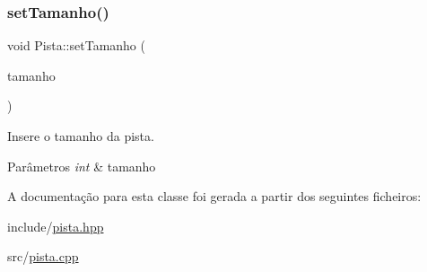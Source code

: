 \subsubsection{\texorpdfstring{set\+Tamanho()}{setTamanho()}}
{\footnotesize\ttfamily void Pista\+::set\+Tamanho (\begin{DoxyParamCaption}\item[{int}]{tamanho }\end{DoxyParamCaption})}



Insere o tamanho da pista. 


\begin{DoxyParams}{Parâmetros}
{\em int} & tamanho \\
\hline
\end{DoxyParams}


A documentação para esta classe foi gerada a partir dos seguintes ficheiros\+:\begin{DoxyCompactItemize}
\item 
include/\hyperlink{pista_8hpp}{pista.\+hpp}\item 
src/\hyperlink{pista_8cpp}{pista.\+cpp}\end{DoxyCompactItemize}
